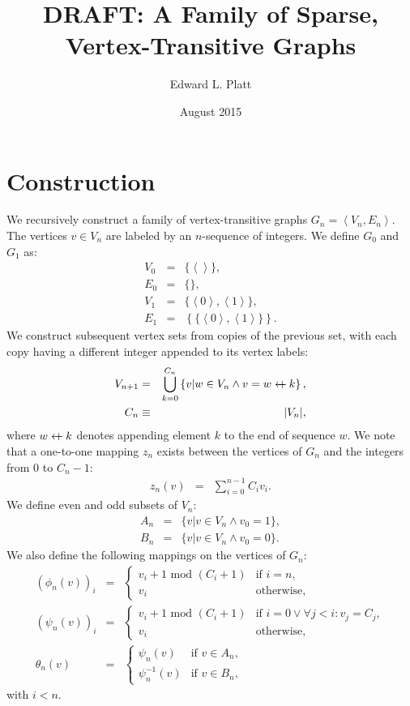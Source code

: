 \documentclass{article}
\title{DRAFT: A Family of Sparse, Vertex-Transitive Graphs}
\author{Edward L. Platt}
\date{August 2015}
\newcommand{\la}{\left\langle}
\newcommand{\ra}{\right\rangle}
\newcommand{\beq}{\begin{eqnarray}}
\newcommand{\eeq}{\end{eqnarray}}
\newcommand{\append}{\leftarrow{\mkern-18mu}{+}\:}
\begin{document}
\maketitle

\section{Construction}

We recursively construct a family of vertex-transitive graphs
$G_n = \la V_n, E_n \ra$.
The vertices $v \in V_n$ are labeled by an $n$-sequence of integers.
We define $G_0$ and $G_1$ as:
\beq
V_0 &=& \{ \la\ra \}, \\
E_0 &=& \{ \}, \\
V_1 &=& \{\la{0}\ra,\la{1}\ra\}, \\
E_1 &=& \left\{\{\la{0}\ra,\la{1}\ra\}\right\}.
\eeq
We construct subsequent vertex sets from copies of the previous set,
with each copy having a different integer appended to its vertex labels:
\beq
\label{eq:vn}
V_{n+1} &=& \bigcup_{k = 0}^{C_n}
\left\{ v | w \in V_n \land v = w \append k \right\},
\\
C_n &\equiv& |V_n|,
\eeq
where $w \append k$ denotes appending element $k$ to the end of sequence $w$.
We note that a one-to-one mapping $z_n$ exists between the vertices of $G_n$ and the
integers from $0$ to $C_n - 1$:
\beq
z_n(v) &=& \sum_{i=0}^{n-1} C_i v_i.
\eeq
We define even and odd subsets of $V_n$:
\beq
A_n &=& \{ v | v \in V_n \land v_0 = 1 \}, \\
B_n &=& \{ v | v \in V_n \land v_0 = 0 \}.
\eeq
We also define the following mappings on the vertices of $G_n$:
\beq
(\phi_n(v))_i
&=&
\begin{cases}
v_i + 1 \mbox{ mod } (C_i + 1) & \mbox{if } i = n,
\\
v_i & \mbox{otherwise},
\end{cases}
\\
(\psi_n(v))_i
&=&
\begin{cases}
v_i + 1 \mbox{ mod } (C_i + 1)
& \mbox{if } i = 0 \lor \forall j < i: v_j = C_j, \\
v_i & \mbox{otherwise},
\end{cases}
\\
\theta_n(v)
&=&
\begin{cases}
\psi_n(v) & \mbox{if } v \in A_n, \\
\psi_n^{-1}(v) & \mbox{if } v \in B_n,
\end{cases}
\eeq
with $i < n$.
\end{document}
